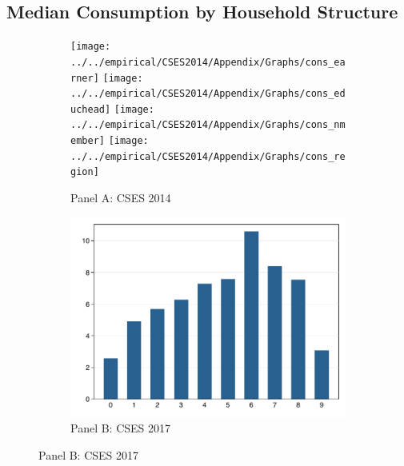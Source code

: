 \documentclass[11pt,letterpaper]{article}
\begin{document}
\subsection{Median Consumption by Household Structure}
\begin{figure}[H]
	\caption{Average household consumption by type}
	\label{fig:3}
	\begin{subfigure}[b]{0.33\linewidth}
		\caption*{Panel A: CSES 2014} \vspace{-.5em}
		\label{fig:3a}
		\texttt{[image: ../../empirical/CSES2014/Appendix/Graphs/cons\_earner]} 
		\vspace{-2.5em}
		\newline {}
		\texttt{[image: ../../empirical/CSES2014/Appendix/Graphs/cons\_educhead]} 
		\vspace{-2.5em}
		\newline {}
		\texttt{[image: ../../empirical/CSES2014/Appendix/Graphs/cons\_nmember]} 
		\vspace{-2.5em}
		\newline {}
		\texttt{[image: ../../empirical/CSES2014/Appendix/Graphs/cons\_region]} 
		\vspace{-2.5em}
		\newline {}
	\end{subfigure}%
	\hfil
	\begin{subfigure}[b]{0.33\linewidth}
		\caption*{Panel B: CSES 2017} \vspace{-.5em}
		\label{fig:3b}
		\includegraphics[width=1\linewidth]{../../empirical/CSES2017/Appendix/Graphs/cons_earner} 

\end{subfigure}
\end{figure}
\end{document}
